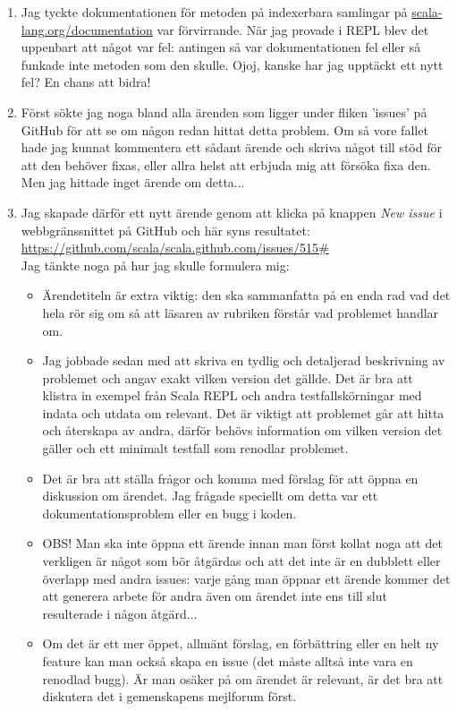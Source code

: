 \begin{enumerate}

\item Jag tyckte dokumentationen för metoden  på indexerbara samlingar på \href{http://scala-lang.org/documentation/}{scala-lang.org/documentation} var förvirrande. När jag provade i REPL blev det uppenbart att något var fel: antingen så var dokumentationen fel eller så funkade inte metoden som den skulle. Ojoj, kanske har jag upptäckt ett nytt fel? En chans att bidra!

\item Först sökte jag noga bland alla ärenden som ligger under fliken 'issues' på GitHub för att se om någon redan hittat detta problem. Om så vore fallet hade jag kunnat kommentera ett sådant ärende och skriva något till stöd för att den behöver fixas, eller allra helst att erbjuda mig att försöka fixa den. Men jag hittade inget ärende om detta...

\item Jag skapade därför ett nytt ärende genom att klicka på knappen \emph{New issue} i webbgränssnittet på GitHub och här syns resultatet: \\ \url{https://github.com/scala/scala.github.com/issues/515#} \\ Jag tänkte noga på hur jag skulle formulera mig:

\begin{itemize}[nolistsep, noitemsep]
  \item Ärendetiteln är extra viktig: den ska sammanfatta på en enda rad vad det hela rör sig om så att läsaren av rubriken förstår vad problemet handlar om.
  \item Jag jobbade sedan med att skriva en tydlig och detaljerad beskrivning av problemet och angav exakt vilken version det gällde. Det är bra att klistra in exempel från Scala REPL och andra testfallskörningar med indata och utdata om relevant. Det är viktigt att problemet går att hitta och återskapa av andra, därför behövs information om vilken version det gäller och ett minimalt testfall som renodlar problemet.
  \item Det är bra att ställa frågor och komma med förslag för att öppna en diskussion om ärendet. Jag frågade speciellt om detta var ett dokumentationsproblem eller en bugg i koden.
  \item OBS! Man ska inte öppna ett ärende innan man först kollat noga att det verkligen är något som bör åtgärdas och att det inte är en dubblett eller överlapp med andra issues: varje gång man öppnar ett ärende kommer det att generera arbete för andra även om ärendet inte ens till slut resulterade i någon åtgärd...
  \item Om det är ett mer öppet, allmänt förslag, en förbättring eller en helt ny feature kan man också skapa en issue (det måste alltså inte vara en renodlad bugg). Är man osäker på om ärendet är relevant, är det bra att diskutera det i gemenskapens mejlforum först.
\end{itemize}


\end{enumerate}
